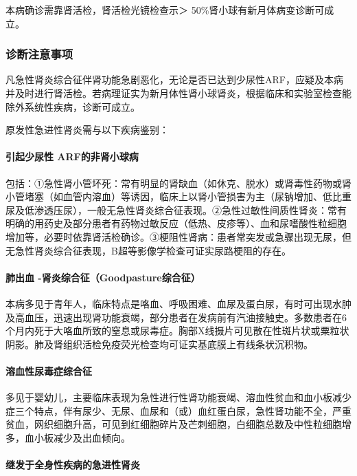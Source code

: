 本病确诊需靠肾活检，肾活检光镜检查示＞
50\%肾小球有新月体病变诊断可成立。

\subsubsection{诊断注意事项}

凡急性肾炎综合征伴肾功能急剧恶化，无论是否已达到少尿性ARF，应疑及本病并及时进行肾活检。若病理证实为新月体性肾小球肾炎，根据临床和实验室检查能除外系统性疾病，诊断可成立。

原发性急进性肾炎需与以下疾病鉴别：

\paragraph{引起少尿性 ARF的非肾小球病}

包括：①急性肾小管坏死：常有明显的肾缺血（如休克、脱水）或肾毒性药物或肾小管堵塞（如血管内溶血）等诱因，临床上以肾小管损害为主（尿钠增加、低比重尿及低渗透压尿），一般无急性肾炎综合征表现。②急性过敏性间质性肾炎：常有明确的用药史及部分患者有药物过敏反应（低热、皮疹等）、血和尿嗜酸性粒细胞增加等，必要时依靠肾活检确诊。③梗阻性肾病：患者常突发或急骤出现无尿，但无急性肾炎综合征表现，B超等影像学检查可证实尿路梗阻的存在。

\paragraph{肺出血 -肾炎综合征（Goodpasture综合征）}

本病多见于青年人，临床特点是咯血、呼吸困难、血尿及蛋白尿，有时可出现水肿及高血压，迅速出现肾功能衰竭，部分患者在发病前有汽油接触史。多数患者在6个月内死于大咯血所致的窒息或尿毒症。胸部X线摄片可见散在性斑片状或粟粒状阴影。肺及肾组织活检免疫荧光检查均可证实基底膜上有线条状沉积物。

\paragraph{溶血性尿毒症综合征}

多见于婴幼儿，主要临床表现为急性进行性肾功能衰竭、溶血性贫血和血小板减少症三个特点，伴有尿少、无尿、血尿和（或）血红蛋白尿，急性肾功能不全，严重贫血，网织细胞升高，可见到红细胞碎片及芒刺细胞，白细胞总数及中性粒细胞增多，血小板减少及出血倾向。

\paragraph{继发于全身性疾病的急进性肾炎}

